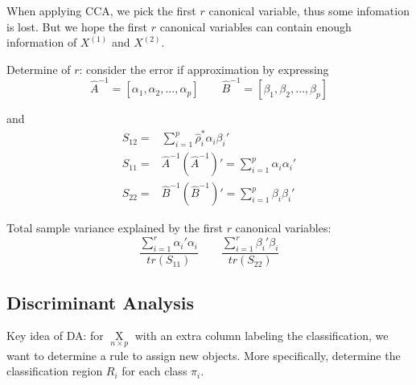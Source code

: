     When applying CCA, we pick the first $ r $ canonical variable, thus some infomation is lost. But we hope the first $ r $ canonical variables can contain enough information of $ X^{(1)} $ and $ X^{(2)} $.

    Determine of $ r $: consider the error if approximation by expressing
    \begin{equation}
        \hat{A}^{-1}=[\alpha _1,\alpha _2,\ldots,\alpha _p]\qquad \hat{B}^{-1}=[\beta _1,\beta _2,\ldots,\beta _p] 
    \end{equation}

    and 
    \begin{align}
        S_{12}=&\sum_{i=1}^p \hat{\rho }^*_i\alpha _i\beta _i'\\
        S_{11}=&\hat{A}^{-1}(\hat{A}^{-1})'=\sum_{i=1}^p\alpha _i\alpha _i'\\
        S_{22}=&\hat{B}^{-1}(\hat{B}^{-1})'=\sum_{i=1}^p\beta _i\beta _i'
    \end{align}
    
    Total sample variance explained by the first $ r $ canonical variables:
    \begin{equation}
        \dfrac{\sum_{i=1}^r\alpha _i'\alpha _i}{tr(S_{11})}\qquad \dfrac{\sum_{i=1}^r\beta _i'\beta _i}{tr(S_{22})} 
    \end{equation}
    
    



\subsection{Discriminant Analysis}\label{SubSectionDiscriminantAnalysis}
    Key idea of DA: for $ \mathop{X}\limits_{n\times p}  $ with an extra column labeling the classification, we want to determine a rule to assign new objects. More specifically, determine the classification region $ R_i $ for each class $ \pi_i $.

